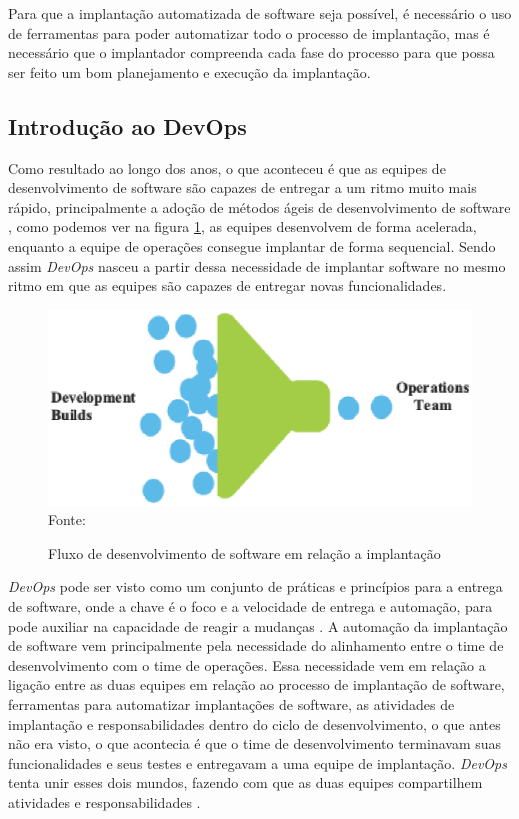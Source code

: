 Para que a implantação automatizada de software seja possível, é necessário o uso
de ferramentas para poder automatizar todo o processo de implantação,
mas é necessário que o implantador compreenda cada fase do processo para que possa ser
feito um bom planejamento e execução da implantação.

\subsection{Introdução ao DevOps}
\label{subsec:DevOps}
Como resultado ao longo dos anos, o que aconteceu é que as equipes de desenvolvimento de software
são capazes de entregar a um ritmo muito mais rápido, principalmente a adoção
de métodos ágeis de desenvolvimento de software \cite{7173368}, como podemos
ver na figura \ref{fig:DevOps}, as equipes desenvolvem de forma acelerada, enquanto
a equipe de operações consegue implantar de forma sequencial. Sendo assim \textit{DevOps}
nasceu a partir dessa necessidade de implantar software no mesmo ritmo em que
as equipes são capazes de entregar novas funcionalidades.

\begin{figure}[h]
  \centering
  \caption{Fluxo de desenvolvimento de software em relação a implantação}
  \includegraphics[width=1.0\textwidth]
      {figuras/devops.eps}
    Fonte: \cite{7173368}
\label{fig:DevOps}
\end{figure}

\textit{DevOps} pode ser visto como um conjunto de práticas e princípios para a entrega de software, onde a
chave é o foco e a velocidade de entrega e automação, para pode auxiliar na capacidade
de reagir a mudanças \cite{7173368}. A automação da implantação de software vem
principalmente pela necessidade do alinhamento entre o time de desenvolvimento
com o time de operações. Essa necessidade vem em relação a ligação entre as duas
equipes em relação ao processo de implantação de software, ferramentas para
automatizar implantações de software, as atividades de implantação e responsabilidades
dentro do ciclo de desenvolvimento, o que antes não era visto, o que acontecia é
que o time de desenvolvimento terminavam suas funcionalidades e seus testes e
entregavam a uma equipe de implantação. \textit{DevOps} tenta unir esses dois mundos,
fazendo com que as duas equipes compartilhem atividades e responsabilidades \cite{6265084}.

